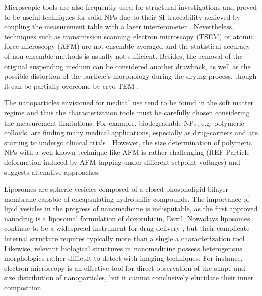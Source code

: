 Microscopic tools are also frequently used for structural investigations \citep{joensson_morphology_1991,silverstein_microstructure_1989} and proved to be useful techniques for solid NPs due to their SI traceability achieved by coupling the measurement table with a laser interferometer \citep{meli_traceable_2012}. Nevertheless, techniques such as transmission scanning electron microscopy (TSEM) or atomic force microscopy (AFM) are not ensemble averaged and the statistical accuracy of non-ensemble methods is usually not sufficient. Besides, the removal of the original suspending medium can be considered another drawback, as well as the possible distortion of the particle's morphology during the drying process, though it can be partially overcome by cryo-TEM \citep{li_doxorubicin_1998}.

The nanoparticles envisioned for medical use tend to be found in the soft matter regime and thus the characterization tools must be carefully chosen considering the measurement limitations. For example, biodegradable NPs, e.g. polymeric colloids, are finding many medical applications, especially as drug-carriers \citep{kattan_phase_1992,vicent_polymer_2006} and are starting to undergo clinical trials \citep{patel_polymeric_2012,beija_colloidal_2012,cabral_progress_2014}. However, the size determination of polymeric NPs with a well-known technique like AFM is rather challenging (REF-Particle deformation induced by AFM tapping under different setpoint voltages) and suggests altenative approaches.

Liposomes are spheric vesicles composed of a closed phospholipid bilayer membrane capable of encapsulating hydrophilic compounds. The importance of lipid vesicles in the progress of nanomedicine is indisputable, as the first approved nanodrug is a liposomal formulation of doxorubicin, Doxil. Nowadays liposomes continue to be a widespread instrument for drug delivery \citep{perez-herrero_advanced_2015}, but their complicate internal structure requires typically more than a single a characterization tool \citep{khorasani_closing_2014}. Likewise, relevant biological structures in nanomedicine possess heterogenous morphologies rather difficult to detect with imaging techniques. For instance, electron microscopy is an effective tool for direct observation of the shape and size distribution of nanoparticles, but it cannot conclusively elucidate their inner composition.

